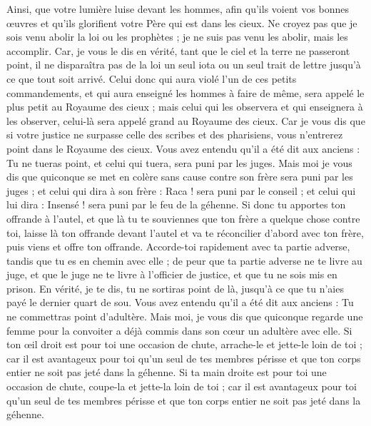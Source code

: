 \begin{multicols}{2}
Ainsi, que votre lumière luise devant les hommes, afin qu'ils voient vos bonnes œuvres et qu'ils glorifient votre Père qui est dans les cieux.
Ne croyez pas que je sois venu abolir la loi ou les prophètes ; je ne suis pas venu les abolir, mais les accomplir.
Car, je vous le dis en vérité, tant que le ciel et la terre ne passeront point, il ne disparaîtra pas de la loi un seul iota ou un seul trait de lettre jusqu'à ce que tout soit arrivé.
Celui donc qui aura violé l'un de ces petits commandements, et qui aura enseigné les hommes à faire de même, sera appelé le plus petit au Royaume des cieux ; mais celui qui les observera et qui enseignera à les observer, celui-là sera appelé grand au Royaume des cieux.
Car je vous dis que si votre justice ne surpasse celle des scribes et des pharisiens, vous n'entrerez point dans le Royaume des cieux.
Vous avez entendu qu'il a été dit aux anciens : Tu ne tueras point, et celui qui tuera, sera puni par les juges.
Mais moi je vous dis que quiconque se met en colère sans cause contre son frère sera puni par les juges ; et celui qui dira à son frère : Raca ! sera puni par le conseil ; et celui qui lui dira : Insensé ! sera puni par le feu de la géhenne.
Si donc tu apportes ton offrande à l'autel, et que là tu te souviennes que ton frère a quelque chose contre toi,
laisse là ton offrande devant l'autel et va te réconcilier d'abord avec ton frère, puis viens et offre ton offrande.
Accorde-toi rapidement avec ta partie adverse, tandis que tu es en chemin avec elle ; de peur que ta partie adverse ne te livre au juge, et que le juge ne te livre à l'officier de justice, et que tu ne sois mis en prison.
En vérité, je te dis, tu ne sortiras point de là, jusqu'à ce que tu n'aies payé le dernier quart de sou.
Vous avez entendu qu'il a été dit aux anciens : Tu ne commettras point d'adultère.
Mais moi, je vous dis que quiconque regarde une femme pour la convoiter a déjà commis dans son cœur un adultère avec elle.
Si ton œil droit est pour toi une occasion de chute, arrache-le et jette-le loin de toi ; car il est avantageux pour toi qu'un seul de tes membres périsse et que ton corps entier ne soit pas jeté dans la géhenne.
Si ta main droite est pour toi une occasion de chute, coupe-la et jette-la loin de toi ; car il est avantageux pour toi qu'un seul de tes membres périsse et que ton corps entier ne soit pas jeté dans la géhenne.

\end{multicols}
